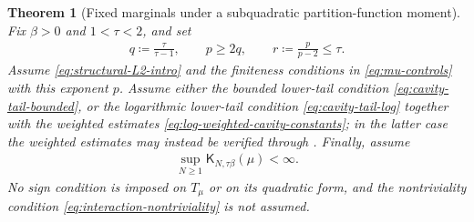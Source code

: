 \documentclass[11pt,reqno]{amsart}
\numberwithin{equation}{section}
\theoremstyle{plain}
\newtheorem{thm}{Theorem}[section]
\theoremstyle{remark}
\newcommand{\K}{{\mathsf{K}}}
\newcommand{\be}{\beta}
\begin{document}
\begin{thm}[Fixed marginals under a subquadratic partition-function moment]
\label{thm:fixed-marginal-Ltau}
Fix \(\be>0\) and \(1<\tau<2\), and set
\begin{align}\label{eq:fixed-marginal-conjugate-exponents}
 q\coloneqq\frac{\tau}{\tau-1},
 \qquad
 p\ge2q,
 \qquad
 r\coloneqq\frac{p}{p-2}\le\tau.
\end{align}
Assume \eqref{eq:structural-L2-intro} and the finiteness conditions in \eqref{eq:mu-controls} with this exponent \(p\).  Assume either the bounded lower-tail condition \eqref{eq:cavity-tail-bounded}, or the logarithmic lower-tail condition \eqref{eq:cavity-tail-log} together with the weighted estimates \eqref{eq:log-weighted-cavity-constants}; in the latter case the weighted estimates may instead be verified through .  Finally, assume
\begin{align}\label{eq:fixed-marginal-partition-input}
 \sup_{N\ge1}\K_{N,\tau\be}(\mu)<\infty.
\end{align}
No sign condition is imposed on \(T_\mu\) or on its quadratic form, and the nontriviality condition \eqref{eq:interaction-nontriviality} is not assumed.


\end{thm}
\end{document}
